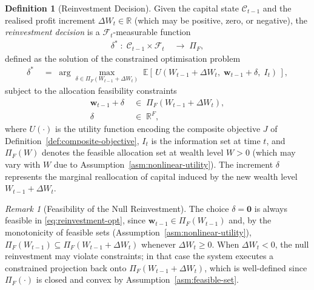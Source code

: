 \documentclass[12pt,openany]{book}
\newcommand{\bfw}{\mathbf{w}}
\newcommand{\calF}{\mathcal{F}}
\newcommand{\calI}{\mathcal{I}}
\newcommand{\E}{\mathbb{E}}
\numberwithin{equation}{chapter}
\theoremstyle{plain}
\theoremstyle{definition}
\newtheorem{definition}[theorem]{Definition}
\theoremstyle{remark}
\newtheorem{remark}[theorem]{Remark}
\numberwithin{equation}{chapter}
\theoremstyle{plain}
\newcommand{\calC}{\mathcal{C}}
\def\calI{I}%
\begin{document}
\begin{definition}[Reinvestment Decision]
\label{def:reinvestment}
Given the capital state $\calC_{t-1}$ and the realised profit
increment $\Delta W_t \in \mathbb{R}$ (which may be positive,
zero, or negative), the \emph{reinvestment decision} is a
$\calF_t$-measurable function
\begin{align}
  \delta^* \;:\; \calC_{t-1} \times \calF_t
  &\;\longrightarrow\; \Pi_F,
  \label{eq:reinvestment-map}
\end{align}
defined as the solution of the constrained optimisation problem
\begin{align}
  \delta^*
  &\;=\; \arg\max_{\delta \in \Pi_F(W_{t-1} + \Delta W_t)}\;
  \E\!\left[\,U\!\left(
    W_{t-1} + \Delta W_t,\;
    \bfw_{t-1} + \delta,\;
    \calI_t
  \right)\,\right],
  \label{eq:reinvestment-opt}
\end{align}
subject to the allocation feasibility constraints
\begin{align}
  \bfw_{t-1} + \delta &\;\in\; \Pi_F(W_{t-1} + \Delta W_t),
  \label{eq:reinvest-feasible} \\
  \delta &\;\in\; \mathbb{R}^F,
  \label{eq:reinvest-domain}
\end{align}
where $U(\cdot)$ is the utility function encoding the composite
objective $J$ of Definition~\ref{def:composite-objective},
$\calI_t$ is the information set at time $t$, and
$\Pi_F(W)$ denotes the feasible allocation set at wealth level
$W > 0$ (which may vary with $W$ due to
Assumption~\ref{asm:nonlinear-utility}).
The increment $\delta$ represents the marginal reallocation of
capital induced by the new wealth level $W_{t-1} + \Delta W_t$.
\end{definition}

\begin{remark}[Feasibility of the Null Reinvestment]
\label{rem:null-reinvestment}
The choice $\delta = \mathbf{0}$ is always feasible in
\eqref{eq:reinvestment-opt}, since $\bfw_{t-1} \in \Pi_F(W_{t-1})$
and, by the monotonicity of feasible sets
(Assumption~\ref{asm:nonlinear-utility}),
$\Pi_F(W_{t-1}) \subseteq \Pi_F(W_{t-1} + \Delta W_t)$ whenever
$\Delta W_t \geq 0$.  When $\Delta W_t < 0$, the null reinvestment
may violate constraints; in that case the system executes a
constrained projection back onto $\Pi_F(W_{t-1} + \Delta W_t)$,
which is well-defined since $\Pi_F(\cdot)$ is closed and convex
by Assumption~\ref{asm:feasible-set}.
\end{remark}
\end{document}

